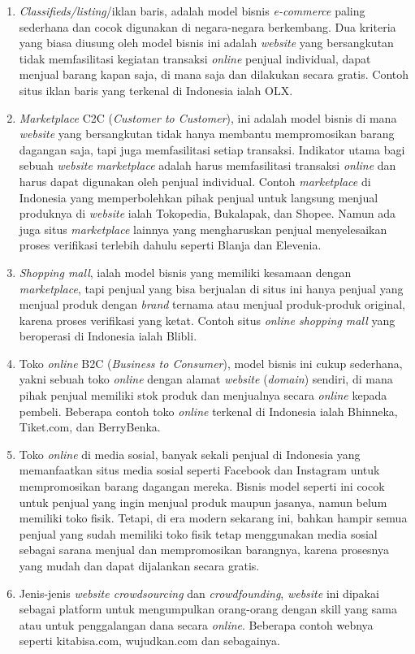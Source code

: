 \begin{enumerate}
	\item \textit{Classifieds/listing}/iklan baris, adalah model bisnis \textit{e-commerce} paling sederhana dan cocok digunakan di negara-negara berkembang. Dua kriteria yang biasa diusung oleh model bisnis ini adalah \textit{website} yang bersangkutan tidak memfasilitasi kegiatan transaksi \textit{online} penjual individual, dapat menjual barang kapan saja, di mana saja dan dilakukan secara gratis. Contoh situs iklan baris yang terkenal di Indonesia ialah OLX.
	\item \textit{Marketplace} C2C (\textit{Customer to Customer}), ini adalah model bisnis di mana \textit{website} yang bersangkutan tidak hanya membantu mempromosikan barang dagangan saja, tapi juga memfasilitasi setiap transaksi. Indikator utama bagi sebuah \textit{website} \textit{marketplace} adalah harus memfasilitasi transaksi \textit{online} dan harus dapat digunakan oleh penjual individual.
	Contoh \textit{marketplace} di Indonesia yang memperbolehkan pihak penjual untuk langsung menjual produknya di \textit{website} ialah Tokopedia, Bukalapak, dan Shopee. Namun ada juga situs \textit{marketplace} lainnya yang mengharuskan penjual menyelesaikan proses verifikasi terlebih dahulu seperti Blanja dan Elevenia.
	\item \textit{Shopping mall}, ialah model bisnis yang memiliki kesamaan dengan \textit{marketplace}, tapi penjual yang bisa berjualan di situs ini hanya penjual yang menjual produk dengan \textit{brand} ternama atau menjual produk-produk original, karena proses verifikasi yang ketat. Contoh situs \textit{online shopping mall} yang beroperasi di Indonesia ialah Blibli.
	\item Toko \textit{online} B2C (\textit{Business to Consumer}), model bisnis ini cukup sederhana, yakni sebuah toko \textit{online} dengan alamat \textit{website} (\textit{domain}) sendiri, di mana pihak penjual memiliki stok produk dan menjualnya secara \textit{online} kepada pembeli.
	Beberapa contoh toko \textit{online} terkenal di Indonesia ialah Bhinneka, Tiket.com, dan BerryBenka.
	\item Toko \textit{online} di media sosial, banyak sekali penjual di Indonesia yang memanfaatkan situs media sosial seperti Facebook dan Instagram untuk mempromosikan barang dagangan mereka. Bisnis model seperti ini cocok untuk penjual yang ingin menjual produk maupun jasanya, namun belum memiliki toko fisik. Tetapi, di era modern sekarang ini, bahkan hampir semua penjual yang sudah memiliki toko fisik tetap menggunakan media sosial sebagai sarana menjual dan mempromosikan barangnya, karena prosesnya yang mudah dan dapat dijalankan secara gratis.
	\item Jenis-jenis \textit{website crowdsourcing} dan \textit{crowdfounding}, \textit{website} ini dipakai sebagai platform untuk mengumpulkan orang-orang dengan skill yang sama atau untuk penggalangan dana secara \textit{online}.
	Beberapa contoh webnya seperti kitabisa.com, wujudkan.com dan sebagainya.
\end{enumerate}

